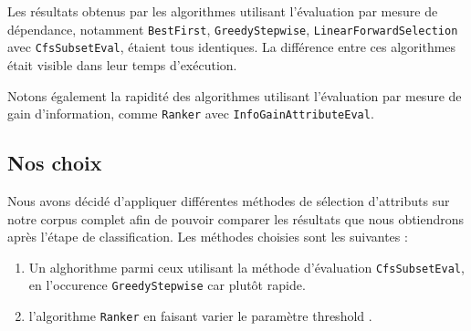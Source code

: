 Les résultats obtenus par les algorithmes utilisant l'évaluation par mesure de dépendance, notamment \texttt{BestFirst}, \texttt{GreedyStepwise}, \texttt{LinearForwardSelection} avec \texttt{CfsSubsetEval}, étaient tous identiques. La différence entre ces algorithmes était visible dans leur temps d'exécution.   

Notons également la rapidité des algorithmes utilisant l'évaluation par mesure de gain d'information, comme \texttt{Ranker} avec \texttt{InfoGainAttributeEval}.


\subsection{Nos choix}

Nous avons décidé d'appliquer différentes méthodes de sélection d'attributs sur notre corpus complet afin de pouvoir comparer les résultats que nous obtiendrons après l'étape de classification. Les méthodes choisies sont les suivantes : 

\begin{enumerate}
\item Un alghorithme parmi ceux utilisant la méthode d'évaluation \texttt{CfsSubsetEval}, en l'occurence \texttt{GreedyStepwise} car plutôt rapide.
\item l'algorithme \texttt{Ranker} en faisant varier le paramètre \og threshold \fg{}.
\end{enumerate}
